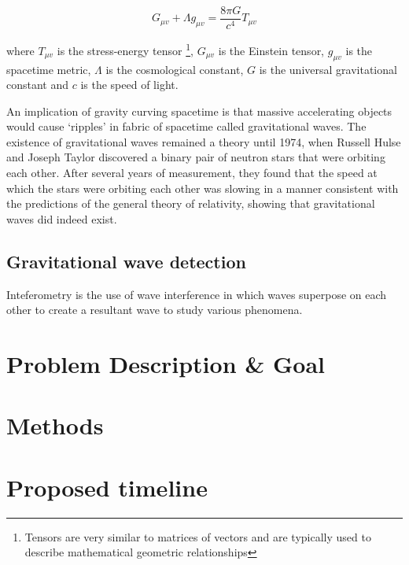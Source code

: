 \documentclass{article}
\begin{document}
\begin{equation}
    G_{\mu{}v} + \Lambda{}g_{\mu{}v} = \dfrac{8\pi{}G}{c^4}T_{\mu{}v}
\end{equation}

where \(T_{\mu{}v}\) is the stress-energy tensor \footnote{Tensors are very similar to matrices of vectors and are typically used to describe mathematical geometric relationships}, \(G_{\mu{}v}\) is the Einstein tensor, \(g_{\mu{}v}\) is the spacetime metric, \(\Lambda\) is the cosmological constant, \(G\) is the universal gravitational constant and \(c\) is the speed of light.

An implication of gravity curving spacetime is that massive accelerating objects would cause `ripples' in fabric of spacetime called gravitational waves. The existence of gravitational waves remained a theory until 1974, when Russell Hulse and Joseph Taylor discovered a binary pair of neutron stars that were orbiting each other. After several years of measurement, they found that the speed at which the stars were orbiting each other was slowing in a manner consistent with the predictions of the general theory of relativity, showing that gravitational waves did indeed exist.

\subsection{Gravitational wave detection}

Inteferometry is the use of wave interference \textemdash{} in which waves superpose on each other to create a resultant wave \textemdash{} to study various phenomena.

\section{Problem Description \& Goal}
\section{Methods}
\section{Proposed timeline}
\end{document}

